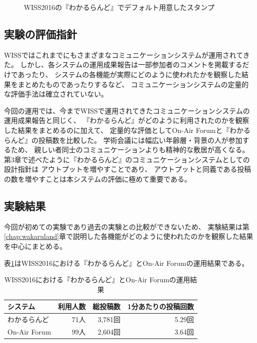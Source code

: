 \begin{figure}[H]
\centering
{}
\caption{WISS2016の『わかるらんど』でデフォルト用意したスタンプ}
\label{wiss2016stamp}
\end{figure}


\subsection{実験の評価指針}
WISSではこれまでにもさまざまなコミュニケーションシステムが運用されてきた。
しかし、各システムの運用成果報告は一部参加者のコメントを掲載するだけであったり、
システムの各機能が実際にどのように使われたかを観察した結果をまとめたものであったりするなど、
コミュニケーションシステムの定量的な評価手法は確立されていない\cite{nishida2006}\cite{nishida2011}。

今回の運用では、今までWISSで運用されてきたコミュニケーションシステムの運用成果報告と同じく、
『わかるらんど』がどのように利用されたのかを観察した結果をまとめるのに加えて、
定量的な評価としてOn-Air Forumと『わかるらんど』の投稿数を比較した。
学術会議には幅広い年齢層・背景の人が参加するため、
親しい者同士のコミュニケーションよりも精神的な敷居が高くなる。
第3章で述べたように『わかるらんど』のコミュニケーションシステムとしての設計指針は
アウトプットを増やすことであり、
アウトプットと同義である投稿の数を増やすことは本システムの評価に極めて重要である。

\subsection{実験結果}
今回が初めての実験であり過去の実験との比較ができないため、
実験結果は第\ref{chap:wakaruland}章で説明した各機能がどのように使われたのかを観察した結果を中心にまとめる。

表\ref{tb:wiss2016experiment}はWISS2016における『わかるらんど』とOn-Air Forumの運用結果である。

\begin{table}[H]
  \begin{center}
    \caption{WISS2016における『わかるらんど』とOn-Air Forumの運用結果}
    \label{tb:wiss2016experiment}
    \begin{tabular}{|l||r|r|r|} \hline
      システム & 利用人数 & 総投稿数 & 1分あたりの投稿回数 \\ \hline \hline
      わかるらんど & 71人 & 3,781回 & 5.29回 \\ \hline
      On-Air Forum & 99人 & 2,604回 & 3.64回 \\ \hline
    \end{tabular}
  \end{center}
\end{table}

